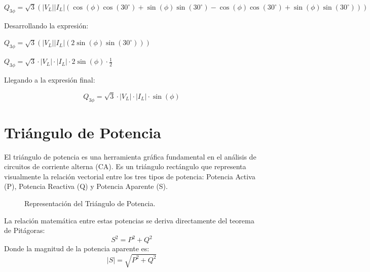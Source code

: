 \documentclass[12pt, letterpaper]{article}
\begin{document}
\(Q_{3 \phi} = \sqrt{3} \left( |V_{L}||I_{L}| \left( \cos(\phi) \cos(30^{\circ}) + \sin(\phi) \sin(30^{\circ}) - \cos(\phi) \cos(30^{\circ}) + \sin(\phi) \sin(30^{\circ}) \right) \right)\)

Desarrollando la expresión:

\(Q_{3 \phi} = \sqrt{3} \left( |V_{L}||I_{L}| \left( 2 \sin(\phi) \sin(30^{\circ}) \right) \right)\)

\(Q_{3 \phi} = \sqrt{3} \cdot |V_{L}| \cdot |I_{L}| \cdot 2 \sin(\phi) \cdot \frac{1}{2}\)

Llegando a la expresión final:

\begin{tcolorbox}[colback=mygray, colframe=ForestGreen, boxrule=0.7pt, arc=2pt, boxsep=1pt, left=2pt, right=2pt, top=2pt, bottom=2pt, title=Expresión demostrada]
\[Q_{3 \phi} = \sqrt{3} \cdot |V_{L}| \cdot |I_{L}| \cdot \sin(\phi)\]
\end{tcolorbox}

\section{Triángulo de Potencia}

El triángulo de potencia es una herramienta gráfica fundamental en el análisis de circuitos de corriente alterna (CA). Es un triángulo rectángulo que representa visualmente la relación vectorial entre los tres tipos de potencia: Potencia Activa (P), Potencia Reactiva (Q) y Potencia Aparente (S).

\begin{figure}[H]
	\centering
	\caption{Representación del Triángulo de Potencia.}
\end{figure}

La relación matemática entre estas potencias se deriva directamente del teorema de Pitágoras:
\[ S^2 = P^2 + Q^2 \]
Donde la magnitud de la potencia aparente es:
\[ |S| = \sqrt{P^2 + Q^2} \]
\end{document}
